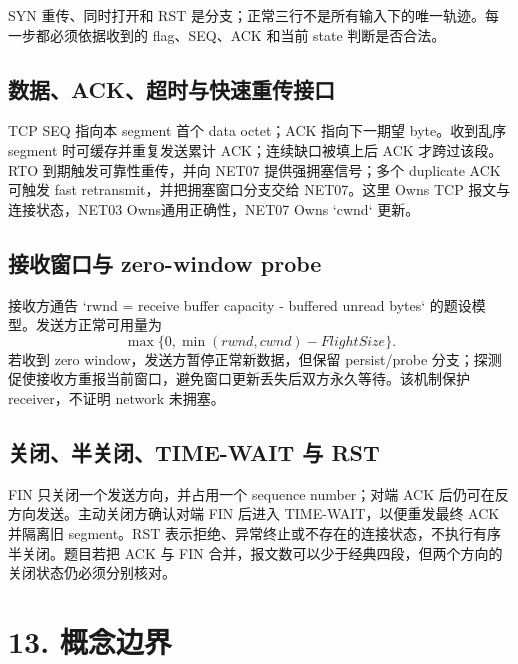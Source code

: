 \documentclass[UTF8,fontset=none,11pt,a4paper]{ctexart}
\begin{document}
SYN 重传、同时打开和 RST 是分支；正常三行不是所有输入下的唯一轨迹。每一步都必须依据收到的 flag、SEQ、ACK 和当前 state 判断是否合法。

\subsection{数据、ACK、超时与快速重传接口}

TCP SEQ 指向本 segment 首个 data octet；ACK 指向下一期望 byte。收到乱序 segment 时可缓存并重复发送累计 ACK；连续缺口被填上后 ACK 才跨过该段。RTO 到期触发可靠性重传，并向 NET07 提供强拥塞信号；多个 duplicate ACK 可触发 fast retransmit，并把拥塞窗口分支交给 NET07。这里 Owns TCP 报文与连接状态，NET03 Owns通用正确性，NET07 Owns `cwnd` 更新。

\subsection{接收窗口与 zero-window probe}

接收方通告 `rwnd = receive buffer capacity - buffered unread bytes` 的题设模型。发送方正常可用量为
\[
\max\{0,\min(rwnd,cwnd)-FlightSize\}.
\]
若收到 zero window，发送方暂停正常新数据，但保留 persist/probe 分支；探测促使接收方重报当前窗口，避免窗口更新丢失后双方永久等待。该机制保护 receiver，不证明 network 未拥塞。

\subsection{关闭、半关闭、TIME-WAIT 与 RST}

FIN 只关闭一个发送方向，并占用一个 sequence number；对端 ACK 后仍可在反方向发送。主动关闭方确认对端 FIN 后进入 TIME-WAIT，以便重发最终 ACK 并隔离旧 segment。RST 表示拒绝、异常终止或不存在的连接状态，不执行有序半关闭。题目若把 ACK 与 FIN 合并，报文数可以少于经典四段，但两个方向的关闭状态仍必须分别核对。

\section{13. 概念边界}\label{11-ux6982ux5ff5ux8fb9ux754c}
\end{document}
